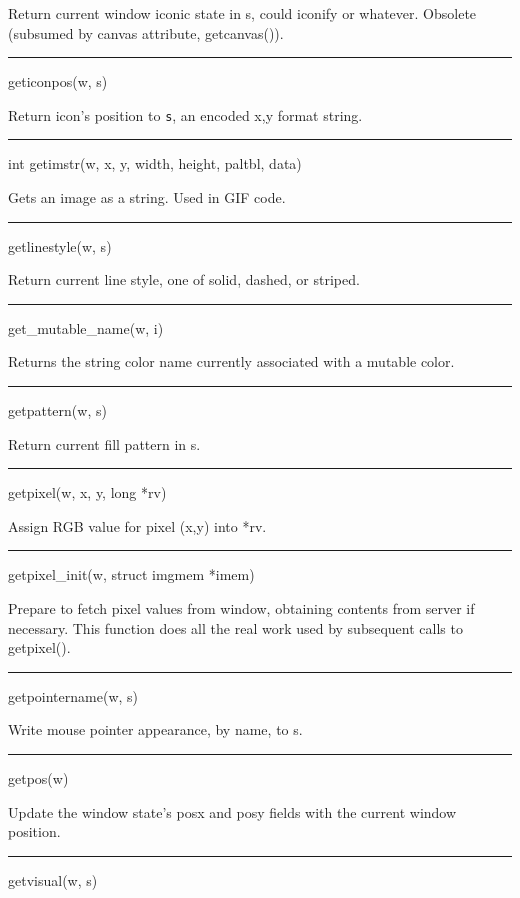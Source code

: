 Return current window iconic state in s, could
{\textquotedbl}iconify{\textquotedbl} or whatever. Obsolete (subsumed
by canvas attribute, getcanvas()).


\bigskip\hrule\vspace{0.1cm}
\noindent
geticonpos(w, s)


Return icon's position to \texttt{s}, an encoded
{\textquotedbl}x,y{\textquotedbl} format string.


\bigskip\hrule\vspace{0.1cm}
\noindent
int getimstr(w, x, y, width, height, paltbl, data)


Gets an image as a string. Used in GIF code.


\bigskip\hrule\vspace{0.1cm}
\noindent
getlinestyle(w, s)


Return current line style, one of solid, dashed, or striped.


\bigskip\hrule\vspace{0.1cm}
\noindent
get\_mutable\_name(w, i)


Returns the string color name currently associated with a mutable color.


\bigskip\hrule\vspace{0.1cm}
\noindent
getpattern(w, s)


Return current fill pattern in s.


\bigskip\hrule\vspace{0.1cm}
\noindent
getpixel(w, x, y, long *rv)


Assign RGB value for pixel (x,y) into *rv.


\bigskip\hrule\vspace{0.1cm}
\noindent
getpixel\_init(w, struct imgmem *imem)


Prepare to fetch pixel values from window, obtaining contents from
server if necessary. This function does all the real work used by
subsequent calls to getpixel().


\bigskip\hrule\vspace{0.1cm}
\noindent
getpointername(w, s)


Write mouse pointer appearance, by name, to s.


\bigskip\hrule\vspace{0.1cm}
\noindent
getpos(w)


Update the window state's posx and posy fields with the current window position.


\bigskip\hrule\vspace{0.1cm}
\noindent
getvisual(w, s)


